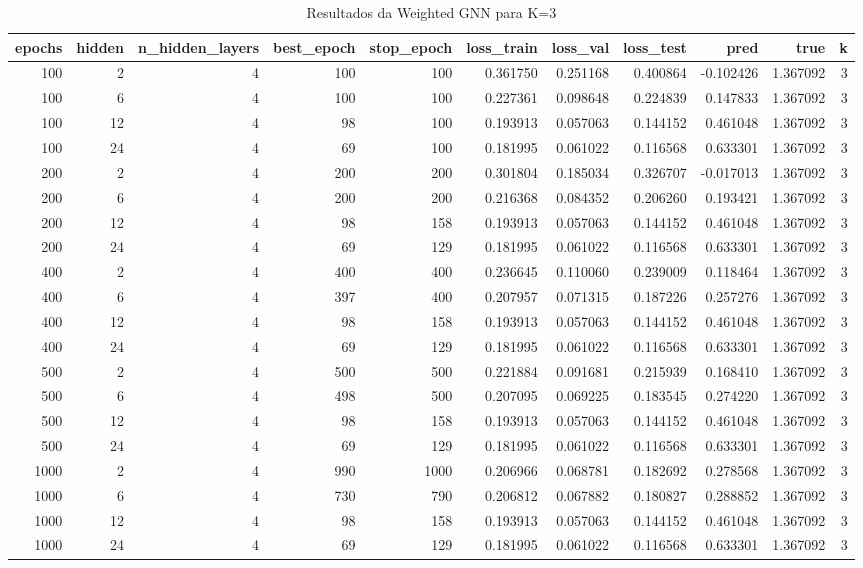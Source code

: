 \begin{table}
\caption{Resultados da Weighted GNN para K=3}
\label{tab:weighted_gnn_results_k3}
\begin{tabular}{rrrrrrrrrrr}
\toprule
epochs & hidden & n\_hidden\_layers & best\_epoch & stop\_epoch & loss\_train & loss\_val & loss\_test & pred & true & k \\
\midrule
100 & 2 & 4 & 100 & 100 & 0.361750 & 0.251168 & 0.400864 & -0.102426 & 1.367092 & 3 \\
100 & 6 & 4 & 100 & 100 & 0.227361 & 0.098648 & 0.224839 & 0.147833 & 1.367092 & 3 \\
100 & 12 & 4 & 98 & 100 & 0.193913 & 0.057063 & 0.144152 & 0.461048 & 1.367092 & 3 \\
100 & 24 & 4 & 69 & 100 & 0.181995 & 0.061022 & 0.116568 & 0.633301 & 1.367092 & 3 \\
200 & 2 & 4 & 200 & 200 & 0.301804 & 0.185034 & 0.326707 & -0.017013 & 1.367092 & 3 \\
200 & 6 & 4 & 200 & 200 & 0.216368 & 0.084352 & 0.206260 & 0.193421 & 1.367092 & 3 \\
200 & 12 & 4 & 98 & 158 & 0.193913 & 0.057063 & 0.144152 & 0.461048 & 1.367092 & 3 \\
200 & 24 & 4 & 69 & 129 & 0.181995 & 0.061022 & 0.116568 & 0.633301 & 1.367092 & 3 \\
400 & 2 & 4 & 400 & 400 & 0.236645 & 0.110060 & 0.239009 & 0.118464 & 1.367092 & 3 \\
400 & 6 & 4 & 397 & 400 & 0.207957 & 0.071315 & 0.187226 & 0.257276 & 1.367092 & 3 \\
400 & 12 & 4 & 98 & 158 & 0.193913 & 0.057063 & 0.144152 & 0.461048 & 1.367092 & 3 \\
400 & 24 & 4 & 69 & 129 & 0.181995 & 0.061022 & 0.116568 & 0.633301 & 1.367092 & 3 \\
500 & 2 & 4 & 500 & 500 & 0.221884 & 0.091681 & 0.215939 & 0.168410 & 1.367092 & 3 \\
500 & 6 & 4 & 498 & 500 & 0.207095 & 0.069225 & 0.183545 & 0.274220 & 1.367092 & 3 \\
500 & 12 & 4 & 98 & 158 & 0.193913 & 0.057063 & 0.144152 & 0.461048 & 1.367092 & 3 \\
500 & 24 & 4 & 69 & 129 & 0.181995 & 0.061022 & 0.116568 & 0.633301 & 1.367092 & 3 \\
1000 & 2 & 4 & 990 & 1000 & 0.206966 & 0.068781 & 0.182692 & 0.278568 & 1.367092 & 3 \\
1000 & 6 & 4 & 730 & 790 & 0.206812 & 0.067882 & 0.180827 & 0.288852 & 1.367092 & 3 \\
1000 & 12 & 4 & 98 & 158 & 0.193913 & 0.057063 & 0.144152 & 0.461048 & 1.367092 & 3 \\
1000 & 24 & 4 & 69 & 129 & 0.181995 & 0.061022 & 0.116568 & 0.633301 & 1.367092 & 3 \\
\bottomrule
\end{tabular}
\end{table}
